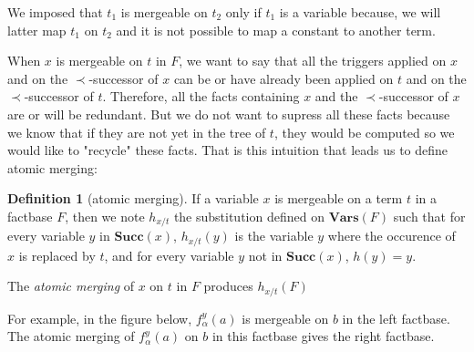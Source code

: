 \documentclass{article}
\theoremstyle{definition}
\newtheorem{definition}{Definition}[section]
\theoremstyle{remark}
\newcommand{\Vars}{\textbf{Vars}}
\newcommand{\su}{\textbf{Succ}}
\begin{document}
We imposed that $t_1$ is mergeable on $t_2$ only if $t_1$ is a variable because, we will latter map $t_1$ on $t_2$ and it is not possible to map a constant to another term.


When $x$ is mergeable on $t$ in $F$, we want to say that all the triggers applied on $x$ and on the $\prec$-successor of $x$ can be or have already been applied on $t$ and on the $\prec$-successor of $t$. Therefore, all the facts containing $x$ and the $\prec$-successor of $x$ are or will be redundant. But we do not want to supress all these facts because we know that if they are not yet in the tree of $t$, they would be computed so we would like to "recycle" these facts. That is this intuition that leads us to define atomic merging:


\begin{definition}[atomic merging]
If a variable $x$ is mergeable on a term $t$ in a factbase $F$, then we note $h_{x/t}$ the substitution defined on $\Vars(F)$ such that for every variable $y$ in $\su(x)$, $h_{x/t}(y)$ is the variable $y$ where the occurence of $x$ is replaced by $t$, and for every variable $y$ not in $\su(x)$, $h(y) = y$. 

The \emph{atomic merging} of $x$ on $t$ in $F$ produces $h_{x/t}(F)$ 
\end{definition}

For example, in the figure below, $f_\alpha^y(a)$ is mergeable on $b$ in the left factbase. The atomic merging of $f_\alpha^y(a)$ on $b$ in this factbase gives the right factbase.
\end{document}
